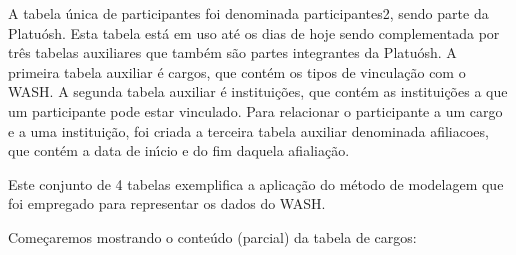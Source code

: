 \documentclass[
12pt,		%
openright,	%
twoside,  %
a4paper,			%
chapter=TITLE,		%
english,			%
french,				%
spanish,			%
brazil				%
]{USPSC-classe/USPSC}
\begin{document}
A tabela \'unica de participantes foi denominada \textquotedbl participantes2\textquotedbl , sendo parte da  \textquotedbl Platu\'osh\textquotedbl . Esta tabela est\'a em uso at\'e os dias de hoje sendo complementada por tr\^es tabelas auxiliares que tamb\'em s\~ao partes integrantes da \textquotedbl Platu\'osh\textquotedbl . A primeira tabela auxiliar \'e \textquotedbl cargos\textquotedbl , que cont\'em os tipos de vincula\c{c}\~ao com o WASH. A segunda tabela auxiliar \'e \textquotedbl institui\c{c}\~oes\textquotedbl , que cont\'em as institui\c{c}\~oes a que um participante pode estar vinculado. Para relacionar o participante a um cargo e a uma institui\c{c}\~ao, foi criada a terceira tabela auxiliar denominada \textquotedbl afiliacoes\textquotedbl , que cont\'em a data de in\'{\i}cio e do fim daquela afialia\c{c}\~ao.










Este conjunto de 4 tabelas exemplifica a aplica\c{c}\~ao do m\'etodo de modelagem que foi empregado para representar os dados do WASH.










Come\c{c}aremos mostrando o conte\'udo (parcial) da tabela de \textquotedbl cargos\textquotedbl :
\end{document}

